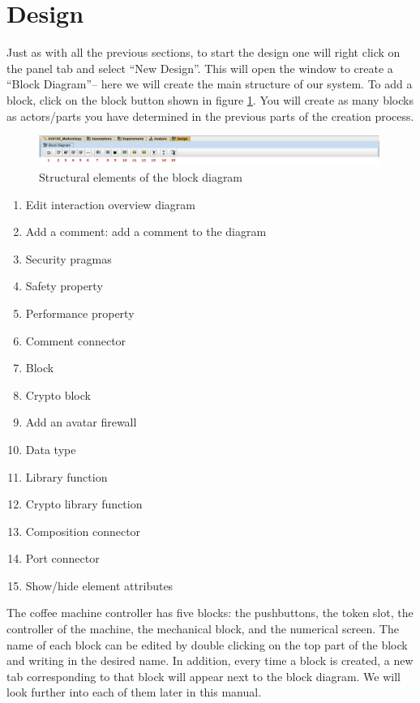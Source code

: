 \documentclass[12pt]{article}
\begin{document}
\section{Design}
	Just as with all the previous sections, to start the design one will right click on the panel tab and select “New Design”. This will open the window to create a “Block Diagram”-- here we will create the main structure of our system. To add a block, click on the block button shown in figure \ref{fig:blockdiagram}. You will create as many blocks as actors/parts you have determined in the previous parts of the creation process. 


\begin{figure}[htbp]
\centering
\includegraphics[width=0.99\textwidth]{fig/blockdiagram.jpg}
\caption{Structural elements of the block diagram} \label{fig:blockdiagram}
\end{figure}


\begin{enumerate}
\item Edit interaction overview diagram
\item Add a comment: add a comment to the diagram
\item Security pragmas
\item Safety property
\item Performance property
\item Comment connector
\item Block
\item Crypto block
\item Add an avatar firewall
\item Data type 
\item Library function
\item Crypto library function
\item Composition connector
\item Port connector
\item Show/hide element attributes

\end{enumerate}

The coffee machine controller has five blocks: the pushbuttons, the token slot, the controller of the machine, the mechanical block, and the numerical screen. The name of each block can be edited by double clicking on the top part of the block and writing in the desired name. In addition, every time a block is created, a new tab corresponding to that block will appear next to the block diagram. We will look further into each of them later in this manual.
\end{document}

